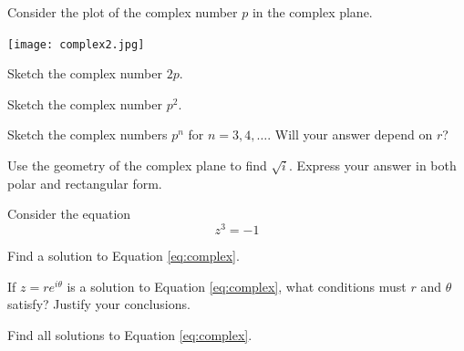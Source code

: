 \documentclass{workbook}
\begin{document}
\begin{slide}
	\question
	Consider the plot of the complex number $p$ in the complex plane.

	\texttt{[image: complex2.jpg]}

	\begin{parts}
		\item Sketch the complex number $2p$.
		\item Sketch the complex number $p^2$.
		\item Sketch the complex numbers $p^n$ for $n=3,4,\ldots$. Will your answer
		depend on $r$?

		\bigskip
		\item Use the geometry of the complex plane to find $\sqrt{i}$. Express
		your answer in both polar and rectangular form.
	\end{parts}
\end{slide}

\begin{slide}
	\question
	Consider the equation
	\begin{equation}
		\label{eq:complex}
		z^3=-1
	\end{equation}

	\begin{parts}
		\item Find a solution to Equation \eqref{eq:complex}.
		\item If $z=re^{i\theta}$ is a solution to Equation \eqref{eq:complex},
		what conditions must $r$ and $\theta$ satisfy? Justify your conclusions.
		\item Find all solutions to Equation \eqref{eq:complex}.

	\end{parts}
\end{slide}

%
%
%
\end{document}
